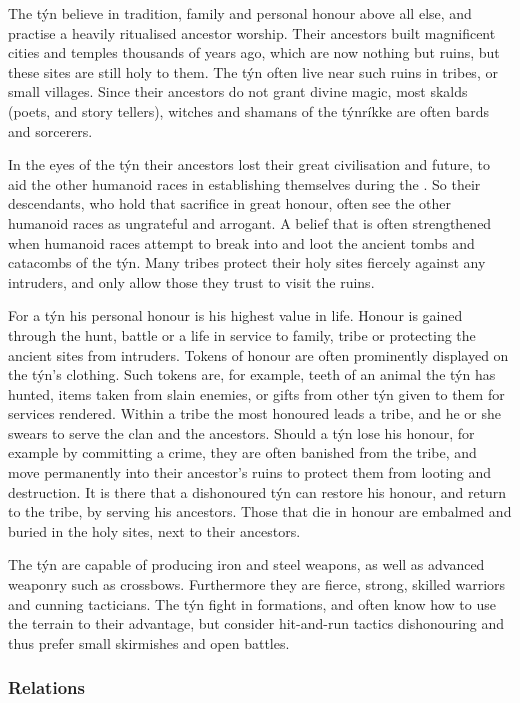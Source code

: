 The týn believe in tradition, family and personal honour above all else, and
practise a heavily ritualised ancestor worship. Their ancestors built
magnificent cities and temples thousands of years ago, which are now nothing
but ruins, but these sites are still holy to them. The týn often live near
such ruins in tribes, or small villages. Since their ancestors do not grant
divine magic, most skalds (poets, and story tellers), witches and shamans
of the týnríkke are often bards and sorcerers.

In the eyes of the týn their ancestors lost their great civilisation and
future, to aid the other humanoid races in establishing themselves during
the . So their descendants, who hold that
sacrifice in great honour, often see the other humanoid races as ungrateful
and arrogant. A belief that is often strengthened when humanoid races attempt
to break into and loot the ancient tombs and catacombs of the týn. Many tribes
protect their holy sites fiercely against any intruders, and only allow those
they trust to visit the ruins.

For a týn his personal honour is his highest value in life. Honour is gained
through the hunt, battle or a life in service to family, tribe or protecting
the ancient sites from intruders. Tokens of honour are often prominently
displayed on the týn's clothing. Such tokens are, for example, teeth of an
animal the týn has hunted, items taken from slain enemies, or gifts from
other týn given to them for services rendered. Within a tribe the most
honoured leads a tribe, and he or she swears to serve the clan and the
ancestors. Should a týn lose his honour, for example by committing a crime,
they are often banished from the tribe, and move permanently into their
ancestor's ruins to protect them from looting and destruction. It is there
that a dishonoured týn can restore his honour, and return to the tribe, by
serving his ancestors. Those that die in honour are embalmed and buried in the
holy sites, next to their ancestors.

The týn are capable of producing iron and steel weapons, as well as advanced
weaponry such as crossbows. Furthermore they are fierce, strong, skilled
warriors and cunning tacticians. The týn fight in formations, and often know
how to use the terrain to their advantage, but consider hit-and-run tactics
dishonouring and thus prefer small skirmishes and open battles.

\subsubsection{Relations}

